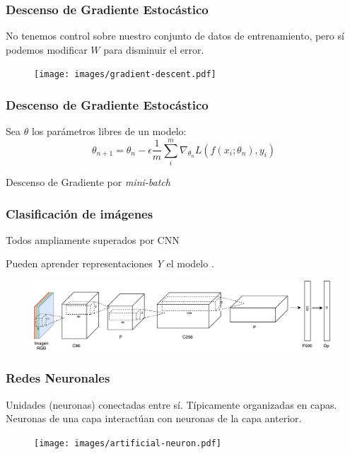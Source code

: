 \documentclass{beamer}
\begin{document}
\begin{frame}
\frametitle{Descenso de Gradiente Estocástico}
No tenemos control sobre nuestro conjunto de datos de entrenamiento, pero sí podemos modificar \(W\) para disminuir el error.
\vfill
\begin{figure}
    \centering
    \texttt{[image: images/gradient-descent.pdf]}
\end{figure}
\vfill
\end{frame}





\begin{frame}
\frametitle{Descenso de Gradiente Estocástico}
Sea \(\theta\) los parámetros libres de un modelo:
\vfill
\begin{equation}
    \theta_{n+1} = \theta_n - \epsilon \frac{1}{m} \sum^{m}_{i} \nabla_{\theta_{n}} L(f(x_i; \theta_n), y_i)
\end{equation}
\vfill

Descenso de Gradiente por \textit{mini-batch}
\vfill
\end{frame}





\begin{frame}
\frametitle{Clasificación de imágenes}

Todos ampliamente superados por CNN

Pueden aprender representaciones \emph{Y} el modelo .
\begin{figure}
    \centering
    \includegraphics[width=\textwidth]{images/net_example.pdf}
\end{figure}
\end{frame}





\begin{frame}[plain]
\frametitle{Redes Neuronales}
Unidades (neuronas) conectadas entre sí.
\vfill
Típicamente organizadas en capas.
\vfill
Neuronas de una capa interactúan con neuronas de la capa anterior.
\begin{figure}
    \centering
    \texttt{[image: images/artificial-neuron.pdf]}
\end{figure}
\end{frame}
\end{document}
